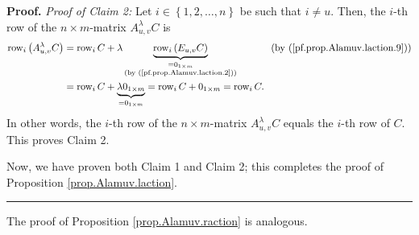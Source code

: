 \documentclass[numbers=enddot,12pt,final,onecolumn,notitlepage]{scrartcl}%
\theoremstyle{definition}
\newenvironment{proof}[1][Proof]{\noindent\textbf{#1.} }{\ \rule{0.5em}{0.5em}}
\begin{document}
\begin{proof}
\textit{Proof of Claim 2:} Let $i\in\left\{  1,2,\ldots,n\right\}  $ be such
that $i\neq u$. Then, the $i$-th row of the $n\times m$-matrix $A_{u,v}%
^{\lambda}C$ is%
\begin{align*}
\operatorname*{row}\nolimits_{i}\left(  A_{u,v}^{\lambda}C\right)   &
=\operatorname*{row}\nolimits_{i}C+\lambda\underbrace{\operatorname*{row}%
\nolimits_{i}\left(  E_{u,v}C\right)  }_{\substack{=0_{1\times m}\\\text{(by
(\ref{pf.prop.Alamuv.laction.2}))}}}\ \ \ \ \ \ \ \ \ \ \left(  \text{by
(\ref{pf.prop.Alamuv.laction.9})}\right) \\
&  =\operatorname*{row}\nolimits_{i}C+\underbrace{\lambda0_{1\times m}%
}_{=0_{1\times m}}=\operatorname*{row}\nolimits_{i}C+0_{1\times m}%
=\operatorname*{row}\nolimits_{i}C.
\end{align*}
In other words, the $i$-th row of the $n\times m$-matrix $A_{u,v}^{\lambda}C$
equals the $i$-th row of $C$. This proves Claim 2.

Now, we have proven both Claim 1 and Claim 2; this completes the proof of
Proposition \ref{prop.Alamuv.laction}.
\end{proof}

The proof of Proposition \ref{prop.Alamuv.raction} is analogous.
\end{document}
